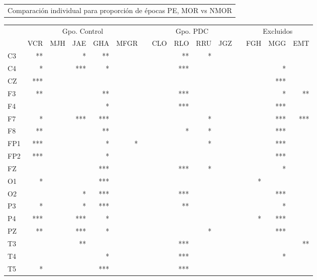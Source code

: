 
\begin{SidewaysTable}
\centering
{}
\begin{tabular}{c}
{Comparación individual para proporción de épocas PE, MOR vs NMOR}
\vspace{1em}
\end{tabular}
\begin{tabular}{lrrrrrcrrrrcrrr}
\toprule
& \multicolumn{5}{c}{{Gpo. Control}} && 
  \multicolumn{4}{c}{{Gpo. PDC}} && 
  \multicolumn{3}{c}{{Excluidos}}\\
\cmidrule{2-6} \cmidrule{8-11} \cmidrule{13-15}
& {VCR} & {MJH} & {JAE} & {GHA} & {MFGR} & \phantom{l}
& {CLO} & {RLO} & {RRU} & {JGZ} & \phantom{l}
& {FGH} & {MGG} & {EMT} \\
\midrule 
{C3} &** & &*  &** &  &&   &** &*  & && & &  \\
{C4} &*  & &***&*  &  &&   &***&   & && &*&  \\
{CZ} &***& &   &   &  &&   &   &   & && &***&  \\
\rowcolor{gris}
{F3} &** & &   &** &  &&   &***&   & && &*&** \\
\rowcolor{gris}
{F4} &   & &   &*  &  &&   &***&   & && &***&  \\
\rowcolor{gris}
{F7} &*  & &***&***&  &&   &   &*  & && &***&*** \\
\rowcolor{gris}
{F8} &** & &   &** &  &&   &*  &*  & && &***&  \\
{FP1}&***& &   &*  &* &&   &   &*  & && &***&  \\
{FP2}&***& &   &*  &  &&   &   &   & && &***&  \\
{FZ} &   & &   &***&  &&   &***&*  & && &*&  \\
\rowcolor{gris}
{O1} &*  & &   &***&  &&   &   &   & &&*& &  \\
\rowcolor{gris}
{O2} &   & &*  &***&  &&   &***&   & && &***& \\ 
{P3} &*  & &*  &***&  &&   &** &   & && &*&  \\
{P4} &***& &***&*  &  &&   &   &   & &&*&***&  \\
{PZ} &** & &***&*  &  &&   &   &*  & && &***&  \\
\rowcolor{gris}
{T3} &   & &** &   &  &&   &***&   & && & &** \\
\rowcolor{gris}
{T4} &   & &   &*  &  &&   &***&   & && &*&  \\
\rowcolor{gris}
{T5} &*  & &   &***&  &&   &***&   & && & &  \\

\end{tabular}
\end{SidewaysTable}

